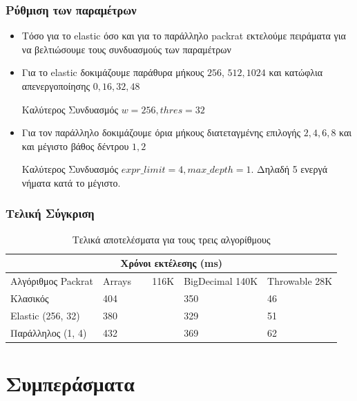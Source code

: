 \documentclass{beamer}
\begin{document}
\begin{frame}
  \frametitle{Ρύθμιση των παραμέτρων}
  \begin{itemize}
	\item Τόσο για το elastic όσο και για το παράλληλο packrat εκτελούμε πειράματα για να βελτιώσουμε τους συνδυασμούς των παραμέτρων \pause
	\item Για το elastic δοκιμάζουμε παράθυρα μήκους $256$, $512, 1024$ και κατώφλια απενεργοποίησης $0, 16, 32, 48$ \pause
	  \begin{block}{Καλύτερος Συνδυασμός}
		$w = 256, thres = 32$
	  \end{block} \pause
	\item Για τον παράλληλο δοκιμάζουμε όρια μήκους διατεταγμένης επιλογής $2, 4, 6, 8$ και και μέγιστο βάθος δέντρου $1, 2$ \pause
	  \begin{block}{Καλύτερος Συνδυασμός}
		$expr\_limit = 4, max\_depth = 1$. Δηλαδή 5 ενεργά νήματα κατά το μέγιστο.
	  \end{block} 
  \end{itemize}
\end{frame}

\begin{frame}
  \frametitle{Τελική Σύγκριση}

\begin{table}[!ht]
\begin{tabular}{ |p{3cm}||p{2cm}|p{2cm}|p{2cm}|  }
 \hline
  \multicolumn{4}{|c|}{Χρόνοι εκτέλεσης (ms)} \\
 \hline
  Αλγόριθμος Packrat& Arrays ~~~  116K &BigDecimal 140K &Throwable 28K\\
 \hline
 Κλασικός & 404 & 350 & \cellcolor{green!45}46\\
  Elastic (256, 32) & \cellcolor{green!45}380 & \cellcolor{green!45}329 & 51\\
  Παράλληλος (1, 4) & 432 & 369 & 62\\
 \hline
\end{tabular}
  \caption{Τελικά αποτελέσματα για τους τρεις αλγορίθμους}
\end{table}

\end{frame}

\section{Συμπεράσματα}
\end{document}
